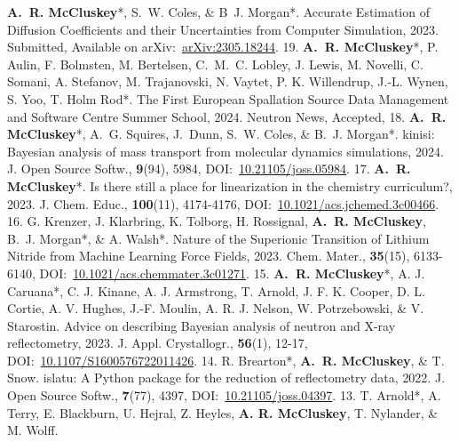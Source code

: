 \begin{cvpubys}
   \cvpuby
    {\textbf{A.~R. McCluskey}*, S.~W. Coles, \& B~J. Morgan*.}
    {Accurate Estimation of Diffusion Coefficients and their Uncertainties from Computer Simulation,}
    {2023.}
    {Submitted,}
    {}
    {Available on arXiv:~\href{https://arxiv.org/abs/2305.18244}{arXiv:2305.18244}.}
    {19.}
  \cvpuby
    {\textbf{A.~R. McCluskey}*, P. Aulin, F. Bolmsten, M. Bertelsen, C.~M.~C. Lobley, J. Lewis, M. Novelli, C. Somani, A. Stefanov, M. Trajanovski, N. Vaytet, P. K. Willendrup, J.-L. Wynen, S. Yoo, T. Holm Rod*.}
    {The First European Spallation Source Data Management and Software Centre Summer School,}
    {2024.}
    {Neutron News, Accepted,}
    {}
    {}
    {18.}
  \cvpuby
    {\textbf{A.~R. McCluskey}*, A.~G. Squires, J.~Dunn, S.~W. Coles, \& B.~J. Morgan*.}
    {kinisi: Bayesian analysis of mass transport from molecular dynamics simulations,}
    {2024.}
    {J. Open Source Softw.,}
    {\textbf{9}(94), 5984,}
    {DOI:~\href{https://doi.org/10.21105/joss.05984}{10.21105/joss.05984}.}
    {17.}
   \cvpuby
    {\textbf{A.~R. McCluskey}*.}
    {Is there still a place for linearization in the chemistry curriculum?,}
    {2023.}
    {J. Chem. Educ.,}
    {\textbf{100}(11), 4174-4176,}
    {DOI:~\href{https://doi.org/10.1021/acs.jchemed.3c00466}{10.1021/acs.jchemed.3c00466}.}
    {16.}
  \cvpuby
    {G. Krenzer, J. Klarbring, K. Tolborg, H. Rossignal, \textbf{A.~R. McCluskey}, B.~J. Morgan*, \& A. Walsh*.}
    {Nature of the Superionic Transition of Lithium Nitride from Machine Learning Force Fields,}
    {2023.}
    {Chem. Mater.,}
    {\textbf{35}(15), 6133-6140,}
    {DOI:~\href{https://doi.org/10.1021/acs.chemmater.3c01271}{10.1021/acs.chemmater.3c01271}.}
    {15.}
  \cvpuby
    {\textbf{A.~R. McCluskey}*, A. J. Caruana*, C. J. Kinane, A. J. Armstrong, T. Arnold, J. F. K. Cooper, D. L. Cortie, A. V. Hughes, J.-F. Moulin, A. R. J. Nelson, W. Potrzebowski, \& V. Starostin.}
    {Advice on describing Bayesian analysis of neutron and X-ray reflectometry,}
    {2023.}
    {J. Appl. Crystallogr.,}
    {\textbf{56}(1), 12-17,}
    {DOI:~\href{https://doi.org/10.1107/S1600576722011426}{10.1107/S1600576722011426}.}
    {14.}
  \cvpuby
    {R. Brearton*, \textbf{A.~R. McCluskey}, \& T. Snow.}
    {islatu: A Python package for the reduction of reflectometry data,}
    {2022.}
    {J. Open Source Softw.,}
    {\textbf{7}(77), 4397,}
    {DOI:~\href{https://doi.org/10.21105/joss.04397}{10.21105/joss.04397}.}
    {13.}
  \cvpuby
    {T. Arnold*, A. Terry, E. Blackburn, U. Hejral, Z. Heyles, \textbf{A. R. McCluskey}, T. Nylander, \& M. Wolff.}

\end{cvpubys}
